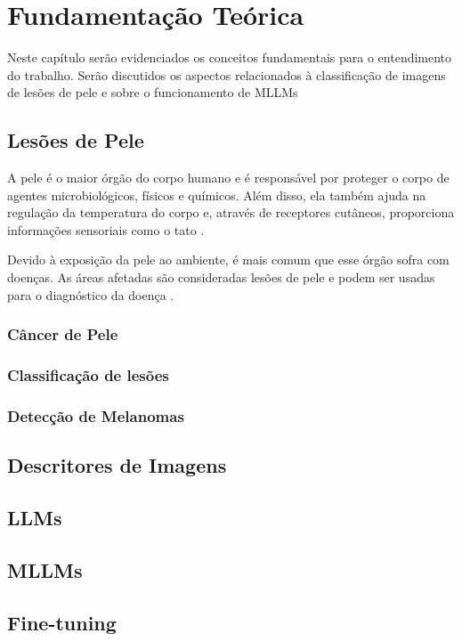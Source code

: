 \chapter{Fundamentação Teórica}

Neste capítulo serão evidenciados os conceitos fundamentais para o entendimento do trabalho. Serão discutidos os aspectos relacionados à classificação de imagens de
lesões de pele e sobre o funcionamento de \ac{MLLMs}

\section{Lesões de Pele}

A pele é o maior órgão do corpo humano e é responsável por proteger o corpo de agentes microbiológicos, físicos e químicos. Além disso, ela também ajuda na regulação da
temperatura do corpo e, através de receptores cutâneos, proporciona informações sensoriais como o tato \cite{skin}.

Devido à exposição da pele ao ambiente, é mais comum que esse órgão sofra com doenças. As áreas afetadas são consideradas lesões de pele e podem ser usadas para o
diagnóstico da doença \cite{segmentation_skin_lesions}.

\subsection{Câncer de Pele}

\subsection{Classificação de lesões}

\subsection{Detecção de Melanomas}

\section{Descritores de Imagens}

\section{LLMs}

\section{MLLMs}

\section{Fine-tuning}
